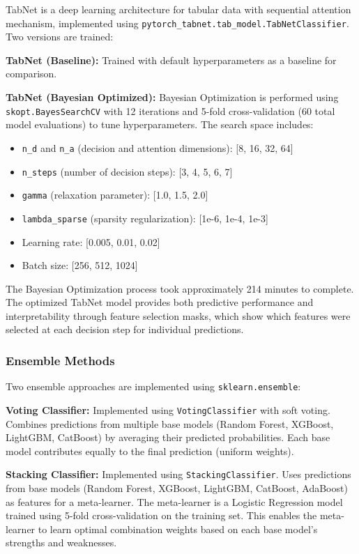 TabNet is a deep learning architecture for tabular data with sequential attention mechanism, implemented using \texttt{pytorch\_tabnet.tab\_model.TabNetClassifier}. Two versions are trained:

\textbf{TabNet (Baseline):} Trained with default hyperparameters as a baseline for comparison.

\textbf{TabNet (Bayesian Optimized):} Bayesian Optimization is performed using \texttt{skopt.BayesSearchCV} with 12 iterations and 5-fold cross-validation (60 total model evaluations) to tune hyperparameters. The search space includes:

\begin{itemize}
    \item \texttt{n\_d} and \texttt{n\_a} (decision and attention dimensions): [8, 16, 32, 64]
    \item \texttt{n\_steps} (number of decision steps): [3, 4, 5, 6, 7]
    \item \texttt{gamma} (relaxation parameter): [1.0, 1.5, 2.0]
    \item \texttt{lambda\_sparse} (sparsity regularization): [1e-6, 1e-4, 1e-3]
    \item Learning rate: [0.005, 0.01, 0.02]
    \item Batch size: [256, 512, 1024]
\end{itemize}

The Bayesian Optimization process took approximately 214 minutes to complete. The optimized TabNet model provides both predictive performance and interpretability through feature selection masks, which show which features were selected at each decision step for individual predictions.

\subsubsection{Ensemble Methods}

Two ensemble approaches are implemented using \texttt{sklearn.ensemble}:

\textbf{Voting Classifier:} Implemented using \texttt{VotingClassifier} with soft voting. Combines predictions from multiple base models (Random Forest, XGBoost, LightGBM, CatBoost) by averaging their predicted probabilities. Each base model contributes equally to the final prediction (uniform weights).

\textbf{Stacking Classifier:} Implemented using \texttt{StackingClassifier}. Uses predictions from base models (Random Forest, XGBoost, LightGBM, CatBoost, AdaBoost) as features for a meta-learner. The meta-learner is a Logistic Regression model trained using 5-fold cross-validation on the training set. This enables the meta-learner to learn optimal combination weights based on each base model's strengths and weaknesses.

